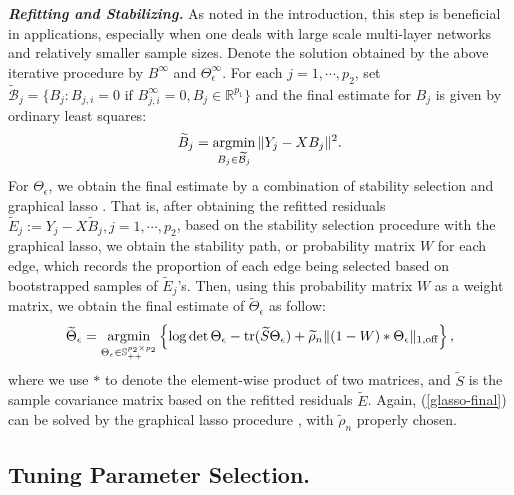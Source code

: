 \textit{\textbf{Refitting and Stabilizing.}} As noted in the introduction, this step is beneficial in applications, especially when one deals with large scale multi-layer networks and relatively smaller sample sizes. Denote the solution obtained by the above iterative procedure by $B^{\infty}$ and $\Theta_\epsilon^\infty$. For each $j=1,\cdots,p_2$, set $\widetilde{\mathcal{B}}_j = \{B_j: B_{j,i}=0 \text{ if }B^\infty_{j,i}=0,B_j\in\mathbb{R}^{p_1}\}$ and the final estimate for $B_j$ is given by ordinary least squares: 
\begin{equation}\label{eqn:refitB}
\widetilde{B}_j = \mathop{\text{argmin}}\limits_{B_j \in \widetilde{\mathcal{B}}_j} \|Y_j - XB_j\|^2.
\end{equation}
For $\Theta_\epsilon$, we obtain the final estimate by a combination of stability selection \citep{meinshausen2010stability} and graphical lasso \citep{friedman2008sparse}. That is, after obtaining the refitted residuals $\widetilde{E}_j:=Y_j-X\widetilde{B}_j,j=1,\cdots,p_2$, based on the stability selection procedure with the graphical lasso, we obtain the stability path, or probability matrix $W$ for each edge, which records the proportion of each edge being selected based on bootstrapped samples of $\widetilde{E}_j$'s. Then, using this probability matrix $W$ as a weight matrix, we obtain the final estimate of $\widetilde{\Theta}_\epsilon$ as follow:
\begin{equation}\label{glasso-final}
\widetilde{\Theta}_\epsilon = \mathop{\text{argmin}}\limits_{\Theta_\epsilon\in\mathbb{S}^{p_2\times p_2}_{++}}\left\{ \log\det \Theta_\epsilon - \mbox{tr}(\widetilde{S}\Theta_\epsilon) + \widetilde{\rho}_n\|(1-W)*\Theta_\epsilon\|_{1,\text{off}} \right\},
\end{equation} 
where we use $*$ to denote the element-wise product of two matrices, and $\widetilde{S}$ is the sample covariance matrix based on the refitted residuals $\widetilde{E}$. Again, (\ref{glasso-final}) can be solved by the graphical lasso procedure \citep{friedman2008sparse}, with $\widetilde{\rho}_n$ properly chosen. 

%
%

\subsection{\normalsize Tuning Parameter Selection.}

